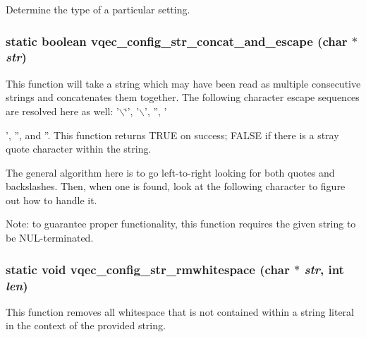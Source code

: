 Determine the type of a particular setting. 
\subsubsection{\setlength{\rightskip}{0pt plus 5cm}static boolean vqec\_\-config\_\-str\_\-concat\_\-and\_\-escape (char $\ast$ {\em str})\hspace{0.3cm}{\tt  [static]}}\label{vqec__config__parser_8c_fb561898819fd39cd5304f634a0153e7}


This function will take a string which may have been read as multiple consecutive strings and concatenates them together. The following character escape sequences are resolved here as well: '$\backslash$\char`\"{}', '$\backslash$', '', '\par
', '', and ''. This function returns TRUE on success; FALSE if there is a stray quote character within the string.

The general algorithm here is to go left-to-right looking for both quotes and backslashes. Then, when one is found, look at the following character to figure out how to handle it.

Note: to guarantee proper functionality, this function requires the given string to be NUL-terminated. 
\subsubsection{\setlength{\rightskip}{0pt plus 5cm}static void vqec\_\-config\_\-str\_\-rmwhitespace (char $\ast$ {\em str}, int {\em len})\hspace{0.3cm}{\tt  [static]}}\label{vqec__config__parser_8c_42d3ab30bab527f5bdc653f10576e6d3}


This function removes all whitespace that is not contained within a string literal in the context of the provided string. 

